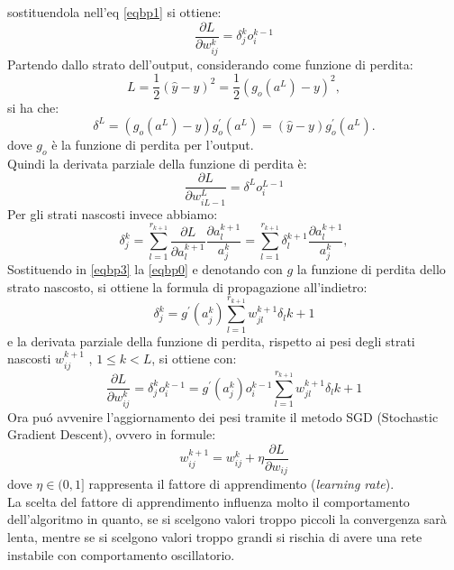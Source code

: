 \documentclass[a4paper,12pt,oneside]{book}
\begin{document}
sostituendola nell'eq \ref{eqbp1} si ottiene:
\begin{equation}
\frac{\partial L}{\partial w_{ij}^k}=\delta_j^k o_i^{k-1}
\end{equation}
Partendo dallo strato dell'output, considerando come funzione di perdita: $$L=\frac{1}{2}(\hat{y}-y)^2=\frac{1}{2}(g_o(a^L)-y)^2,$$
si ha che:
\begin{equation}
\delta^{L}=(g_o(a^L)-y)g_o^{\prime}(a^L)=(\hat{y}-y)g_o^{\prime}(a^L).
\end{equation}
dove $g_o$ \`e la funzione di perdita per l'output.\\
Quindi la derivata parziale della funzione di perdita \`e:
\begin{equation}
\frac{\partial L}{\partial w_{iL-1}^L}=\delta^L o_i^{L-1}
\end{equation}
Per gli strati nascosti invece abbiamo:
\begin{equation}\label{eqbp3}
\delta_j^k=\sum_{l=1}^{r_{k+1}}\frac{\partial L}{\partial a_l^{k+1}}\frac{\partial a_l^{k+1}}{a_j^k}=\sum_{l=1}^{r_{k+1}} \delta_l^{k+1} \frac{\partial a_l^{k+1}}{a_j^k},
\end{equation}
Sostituendo in \ref{eqbp3} la \ref{eqbp0} e denotando con $g$ la funzione di perdita dello strato nascosto, si ottiene la formula di propagazione all'indietro:
\begin{equation}
\delta_j^k=g^{\prime}(a_j^k)\sum_{l=1}^{r_{k+1}}w_{jl}^{k+1}\delta_l{k+1}
\end{equation} 
e la derivata parziale della funzione di perdita, rispetto ai pesi degli strati nascosti $w_{ij}^{k+1}$ , $1\leq k < L$, si ottiene con:
\begin{equation}
\frac{\partial L}{\partial w_{ij}^k}=\delta_j^k o_i^{k-1}=g^{\prime}(a_j^k)o_i^{k-1}\sum_{l=1}^{r_{k+1}}w_{jl}^{k+1}\delta_l{k+1}
\end{equation}
Ora pu\'{o} avvenire l'aggiornamento dei pesi tramite il metodo SGD (Stochastic Gradient Descent), ovvero in formule:
\begin{equation}\label{eqbp4}
w_{ij}^{k+1}=w_{ij}^k + \eta \frac{\partial L}{\partial w_{ij}}
\end{equation}
dove $\eta \in (0,1]$ rappresenta il fattore di apprendimento (\textit{learning rate}).\\
La scelta del fattore di apprendimento influenza molto il comportamento dell'algoritmo in quanto, se si scelgono valori troppo piccoli la convergenza sar\`{a} lenta, mentre se si scelgono valori troppo grandi si rischia di avere una rete instabile con comportamento oscillatorio.\\
\end{document}
